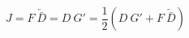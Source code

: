 \begin{equation}
J=F~\overleftarrow{\bar{D}}=D~G' =\frac{1}{2}(D~G'+F~\overleftarrow{\bar{D}})
\end{equation}

